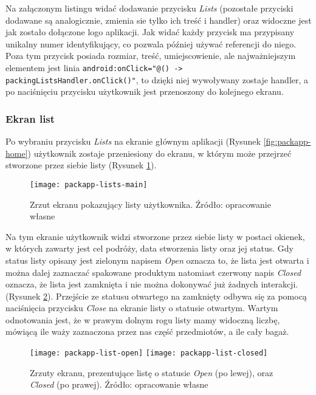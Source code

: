 \documentclass[a4paper,12pt]{article}
\begin{document}
Na załączonym listingu widać dodawanie przycisku \textit{Lists} (pozostałe przyciski dodawane są analogicznie, zmienia sie tylko ich treść i handler) oraz widoczne jest jak zostało dołączone logo aplikacji.
Jak widać każdy przycisk ma przypisany unikalny numer identyfikujący, co pozwala później używać referencji do niego. Poza tym przycisk posiada rozmiar, treść, umiejscowienie, ale najważniejszym elementem jest linia \texttt{android:onClick="@{() -> packingListsHandler.onClick()}"}, to dzięki niej wywoływany zostaje handler, a po naciśnięciu przycisku użytkownik jest przenoszony do kolejnego ekranu.

\subsubsection{Ekran list}

Po wybraniu przycisku \textit{Lists} na ekranie głównym aplikacji (Rysunek \ref{fig:packapp-home}) użytkownik zostaje przeniesiony do ekranu, w którym może przejrzeć stworzone przez siebie listy (Rysunek \ref{fig:packapp-lists-main}).

\begin{figure}[H]
    \centering
    \texttt{[image: packapp-lists-main]}
    \caption{Zrzut ekranu pokazujący listy użytkownika. Źródło: opracowanie własne}
    \label{fig:packapp-lists-main}
\end{figure}

Na tym ekranie użytkownik widzi stworzone przez siebie listy w postaci okienek, w których zawarty jest cel podróży, data stworzenia listy oraz jej status. Gdy status listy opisany jest zielonym napisem \textit{Open} oznacza to, że lista jest otwarta i można dalej zaznaczać spakowane produktym natomiast czerwony napis \textit{Closed} oznacza, że lista jest zamknięta i nie można dokonywać już żadnych interakcji. (Rysunek \ref{fig:packapp-list-status}). Przejście ze statusu otwartego na zamknięty odbywa się za pomocą naciśnięcia przycisku \textit{Close} na ekranie listy o statusie otwartym. Wartym odnotowania jest, że w prawym dolnym rogu listy mamy widoczną liczbę, mówiącą ile waży zaznaczona przez nas część przedmiotów, a ile cały bagaż.

\begin{figure}[H]
    \centering
    \texttt{[image: packapp-list-open]}
    \hfill
    \texttt{[image: packapp-list-closed]}
    \caption{Zrzuty ekranu, prezentujące listę o statusie \textit{Open} (po lewej), oraz \textit{Closed} (po prawej). Źródło: opracowanie własne}
    \label{fig:packapp-list-status}
\end{figure}
\end{document}
